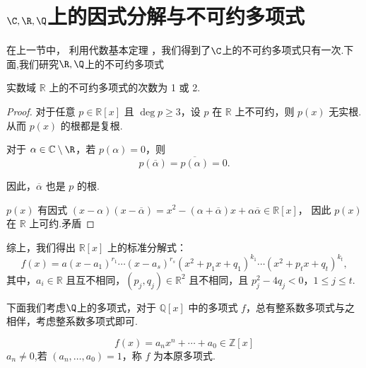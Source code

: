 \section{$\C,\R,\Q$上的因式分解与不可约多项式}
在上一节中， 利用代数基本定理 ，我们得到了$\C$上的不可约多项式只有一次.下面,我们研究$\R,\Q$上的不可约多项式
\begin{proposition}
	实数域 $\mathbb{R}$ 上的不可约多项式的次数为 1 或 2.
\end{proposition}
\begin{proof}
	对于任意 $ p \in \mathbb{R}[x] $ 且 $ \deg p \geqslant 3 $，设 $ p $ 在 $\mathbb{R}$ 上不可约，则 $ p(x) $ 无实根.从而 $ p(x) $ 的根都是复根.
	
	对于 $ \alpha \in \mathbb{C}\setminus\R $，若 $ p(\alpha) = 0 $，则
	$$
	p(\overline{\alpha}) = \overline{p(\alpha)} = 0.
	$$
	
	因此，$ \overline{\alpha }$ 也是 $ p $ 的根.
	
	$ p(x) $ 有因式 $ (x - \alpha)(x - \overline{\alpha}) = x^2 - (\alpha + \overline{\alpha})x + \alpha \overline{\alpha} \in \mathbb{R}[x] $，
	因此 $ p(x) $ 在 $\mathbb{R}$ 上可约.矛盾
	
\end{proof}

综上，我们得出 $\mathbb{R}[x]$ 上的标准分解式：
$$
f(x) = a (x - a_1)^{r_1} \cdots (x - a_s)^{r_s} (x^2 + p_1 x + q_1)^{k_1} \cdots (x^2 + p_t x + q_t)^{k_t},
$$
其中，$ a_i \in \mathbb{R} $ 且互不相同，$ (p_j, q_j) \in \mathbb{R}^2 $ 且不相同，且 $ p_j^2 - 4 q_j < 0 $，$ 1 \leq j \leq t $.

下面我们考虑$\Q$上的多项式，对于 \( \mathbb{Q}[x] \) 中的多项式 \( f \)，总有整系数多项式与之相伴，考虑整系数多项式即可.
\begin{definition}
	$$ f(x) = a_n x^n + \cdots + a_0 \in \mathbb{Z}[x]$$\( \)\( a_n \neq 0 \),若 \( (a_n, \ldots, a_0) = 1 \)，称 \( f \) 为本原多项式.
\end{definition}

